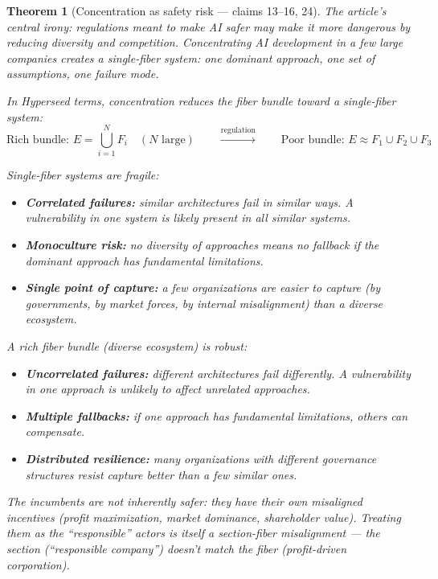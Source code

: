 \documentclass[11pt,a4paper]{article}
\newtheorem{theorem}[definition]{Theorem}
\begin{document}
\begin{theorem}[Concentration as safety risk --- claims 13--16, 24]
\label{thm:fragility}
The article's central irony: regulations meant to make AI safer may
make it more dangerous by reducing diversity and competition.
Concentrating AI development in a few large companies creates a
\emph{single-fiber system}: one dominant approach, one set of
assumptions, one failure mode.

In Hyperseed terms, concentration reduces the fiber bundle toward
a single-fiber system:
\[
  \text{Rich bundle: } E = \bigcup_{i=1}^{N} F_i \quad (N \text{ large})
  \qquad \xrightarrow{\text{regulation}} \qquad
  \text{Poor bundle: } E \approx F_1 \cup F_2 \cup F_3
\]

Single-fiber systems are fragile:
\begin{itemize}
\item \textbf{Correlated failures:} similar architectures fail in
  similar ways. A vulnerability in one system is likely present in
  all similar systems.
\item \textbf{Monoculture risk:} no diversity of approaches means
  no fallback if the dominant approach has fundamental limitations.
\item \textbf{Single point of capture:} a few organizations are
  easier to capture (by governments, by market forces, by internal
  misalignment) than a diverse ecosystem.
\end{itemize}

A rich fiber bundle (diverse ecosystem) is robust:
\begin{itemize}
\item \textbf{Uncorrelated failures:} different architectures fail
  differently. A vulnerability in one approach is unlikely to affect
  unrelated approaches.
\item \textbf{Multiple fallbacks:} if one approach has fundamental
  limitations, others can compensate.
\item \textbf{Distributed resilience:} many organizations with
  different governance structures resist capture better than a few
  similar ones.
\end{itemize}

The incumbents are not inherently safer: they have their own
misaligned incentives (profit maximization, market dominance,
shareholder value). Treating them as the ``responsible'' actors
is itself a section-fiber misalignment --- the section
(``responsible company'') doesn't match the fiber
(profit-driven corporation).
\end{theorem}
\end{document}

